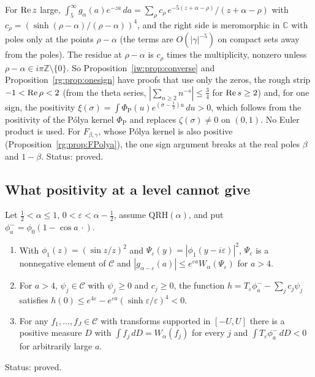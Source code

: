 \begin{remark}\label{rg:rem:zeroonly}
For $\operatorname{Re} z$ large, $\int_5^\infty g_\alpha(a)e^{-za}\,da=\sum_\rho c_\rho\,e^{-5(z+\alpha-\rho)}/(z+\alpha-\rho)$ with $c_\rho=(\sinh(\rho-\alpha)/(\rho-\alpha))^4$, and the right side is meromorphic in $\mathbb C$ with poles only at the points $\rho-\alpha$ (the terms are $O(|\gamma|^{-5})$ on compact sets away from the poles). The residue at $\rho-\alpha$ is $c_\rho$ times the multiplicity, nonzero unless $\rho-\alpha\in i\pi\mathbb Z\setminus\{0\}$. So Proposition~\ref{iw:prop:converse} and Proposition~\ref{rg:prop:onesign} have proofs that use only the zeros, the rough strip $-1<\operatorname{Re}\rho<2$ (from the theta series, $|\sum_{n\ge2}n^{-s}|\le\frac34$ for $\operatorname{Re} s\ge2$) and, for one sign, the positivity $\xi(\sigma)=\int\Phi_{\mathrm P}(u)e^{(\sigma-\frac12)u}\,du>0$, which follows from the positivity of the P\'olya kernel $\Phi_{\mathrm P}$ and replaces $\zeta(\sigma)\ne0$ on $(0,1)$. No Euler product is used. For $F_{\beta,\gamma}$, whose P\'olya kernel is also positive (Proposition~\ref{rg:prop:FPolya}), the one sign argument breaks at the real poles $\beta$ and $1-\beta$. Status: proved.
\end{remark}

\subsection*{What positivity at a level cannot give}

\begin{theorem}\label{rg:thm:certificate}
Let $\frac12<\alpha\le1$, $0<\varepsilon<\alpha-\frac12$, assume $\mathrm{QRH}(\alpha)$, and put $\phi_a^-=\phi_0(1-\cos a\,\cdot)$.
\begin{enumerate}
\item[(a)] With $\phi_1(z)=(\sin z/z)^2$ and $\Psi_\varepsilon(y)=|\phi_1(y-i\varepsilon)|^2$, $\Psi_\varepsilon$ is a nonnegative element of $\mathcal C$ and $|g_{\alpha-\varepsilon}(a)|\le e^{\varepsilon a}W_\alpha(\Psi_\varepsilon)$ for $a>4$.
\item[(b)] For $a>4$, $\psi_j\in\mathcal C$ with $\psi_j\ge0$ and $c_j\ge0$, the function $h=T_\varepsilon\phi_a^--\sum_jc_j\psi_j$ satisfies $h(0)\le e^{4\varepsilon}-e^{\varepsilon a}(\sinh\varepsilon/\varepsilon)^4<0$.
\item[(c)] For any $f_1,\dots,f_J\in\mathcal C$ with transforms supported in $[-U,U]$ there is a positive measure $D$ with $\int f_j\,dD=W_\alpha(f_j)$ for every $j$ and $\int T_\varepsilon\phi_a^-\,dD<0$ for arbitrarily large $a$.
\end{enumerate}
Status: proved.
\end{theorem}

